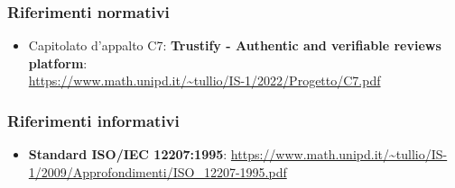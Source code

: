     \subsubsection{Riferimenti normativi}
        \begin{itemize}
            \item Capitolato d'appalto C7: \textbf{Trustify - Authentic and verifiable reviews platform}: \\
            \url{https://www.math.unipd.it/~tullio/IS-1/2022/Progetto/C7.pdf}
        \end{itemize}
    \subsubsection{Riferimenti informativi}
        \begin{itemize}
            \item \textbf{Standard ISO/IEC 12207:1995}: \url{https://www.math.unipd.it/~tullio/IS-1/2009/Approfondimenti/ISO_12207-1995.pdf}
        \end{itemize}
